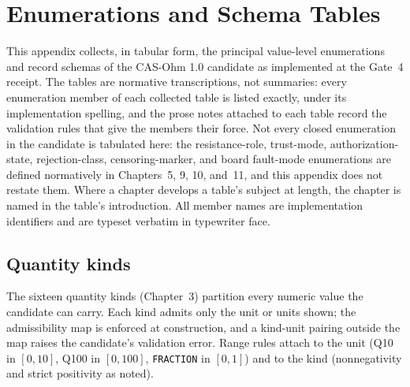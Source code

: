 \chapter{Enumerations and Schema Tables}\label{enums:chapter}

This appendix collects, in tabular form, the principal value-level enumerations and record schemas of the CAS-Ohm 1.0 candidate as implemented at the Gate~4 receipt. The tables are normative transcriptions, not summaries: every enumeration member of each collected table is listed exactly, under its implementation spelling, and the prose notes attached to each table record the validation rules that give the members their force. Not every closed enumeration in the candidate is tabulated here: the resistance-role, trust-mode, authorization-state, rejection-class, censoring-marker, and board fault-mode enumerations are defined normatively in Chapters~5, 9, 10, and~11, and this appendix does not restate them. Where a chapter develops a table's subject at length, the chapter is named in the table's introduction. All member names are implementation identifiers and are typeset verbatim in typewriter face.

\section{Quantity kinds}\label{enums:sec:quantity}

The sixteen quantity kinds (Chapter~3) partition every numeric value the candidate can carry. Each kind admits only the unit or units shown; the admissibility map is enforced at construction, and a kind-unit pairing outside the map raises the candidate's validation error. Range rules attach to the unit (Q10 in $[0,10]$, Q100 in $[0,100]$, \texttt{FRACTION} in $[0,1]$) and to the kind (nonnegativity and strict positivity as noted).

